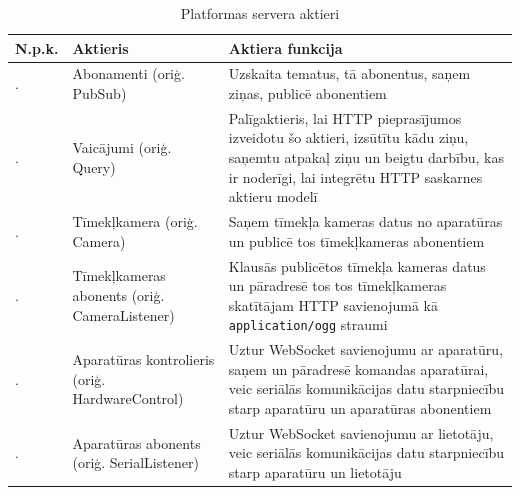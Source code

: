 \begin{table}[H]
    \newcommand\rownumber{\stepcounter{serveractorcounter}\arabic{serveractorcounter}.}
    \begin{tabular}{ |p{1cm}|p{5cm}|p{9cm}| }
    \hline
    N.p.k.&Aktieris&Aktiera funkcija \\
    \hline
    \rownumber & Abonamenti (oriģ. PubSub) & Uzskaita tematus, tā abonentus,
        saņem ziņas, publicē abonentiem \\
    \hline
    \rownumber & Vaicājumi (oriģ. Query) & Palīgaktieris, lai HTTP pieprasījumos
        izveidotu šo aktieri, izsūtītu kādu ziņu, saņemtu atpakaļ ziņu un beigtu
        darbību, kas ir noderīgi, lai integrētu HTTP saskarnes aktieru modelī \\
    \hline
    \rownumber & Tīmekļkamera (oriģ. Camera) & Saņem tīmekļa kameras datus no
        aparatūras un publicē tos tīmekļkameras abonentiem \\
    \hline
    \rownumber & Tīmekļkameras abonents (oriģ. CameraListener) & Klausās
        publicētos tīmekļa kameras datus un pāradresē tos tos tīmekļkameras
        skatītājam HTTP savienojumā kā \lstinline!application/ogg! straumi \\
    \hline
    \rownumber & Aparatūras kontrolieris (oriģ. HardwareControl) & Uztur
        WebSocket savienojumu ar aparatūru, saņem un pāradresē komandas
        aparatūrai, veic seriālās komunikācijas datu starpniecību starp
        aparatūru un aparatūras abonentiem \\
    \hline
    \rownumber & Aparatūras abonents (oriģ. SerialListener) & Uztur WebSocket
        savienojumu ar lietotāju, veic seriālās komunikācijas datu starpniecību
        starp aparatūru un lietotāju \\
    \hline
    \end{tabular}
    \centering
    \captionsetup{justification=centering}
    \caption{Platformas servera aktieri}
    \label{table:serveractors}
\end{table}

